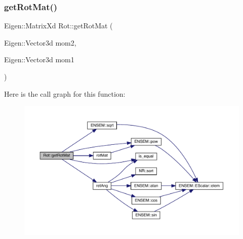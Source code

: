 \subsubsection{\texorpdfstring{getRotMat()}{getRotMat()}}
{\footnotesize\ttfamily Eigen\+::\+Matrix\+Xd Rot\+::get\+Rot\+Mat (\begin{DoxyParamCaption}\item[{Eigen\+::\+Vector3d}]{mom2,  }\item[{Eigen\+::\+Vector3d}]{mom1 }\end{DoxyParamCaption})}

Here is the call graph for this function\+:
\nopagebreak
\begin{figure}[H]
\begin{center}
\leavevmode
\includegraphics[width=350pt]{d7/dcc/namespaceRot_a4026d82f0e6d2b013f7b082ff3d509aa_cgraph}
\end{center}
\end{figure}
